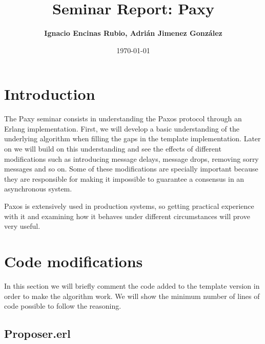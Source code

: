 \documentclass[a4paper, 10pt]{article}
\title{Seminar Report: Paxy}
\author{\textbf{Ignacio Encinas Rubio, Adrián Jimenez González}}
\date{\normalsize\today{}}
\begin{document}
\maketitle

  
  

\section{Introduction}

The Paxy seminar consists in understanding the Paxos protocol through an Erlang implementation. First, we will develop a basic understanding of the underlying algorithm when filling the gaps in the template implementation. Later on we will build on this understanding and see the effects of different modifications such as introducing message delays, message drops, removing sorry messages and so on. Some of these modifications are specially important because they are responsible for making it impossible to guarantee a consensus in an asynchronous system.


Paxos is extensively used in production systems, so getting practical experience with it and examining how it behaves under different circumstances will prove very useful.


\section{Code modifications}

   In this section we will briefly comment the code added to the template version in order to
   make the algorithm work. We will show the minimum number of lines of code possible to follow the reasoning.

  \subsection{Proposer.erl}
\end{document}
